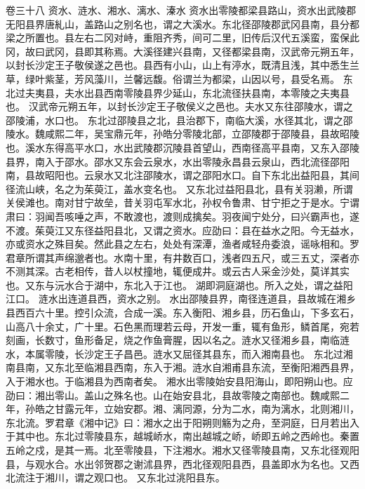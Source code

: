\documentclass[12pt,UTF8]{ctexbook}
\begin{document}
卷三十八  资水、涟水、湘水、漓水、溱水 
资水出零陵都梁县路山，资水出武陵郡无阳县界唐糺山，盖路山之别名也，谓之大溪水。东北径邵陵郡武冈县南，县分都梁之所置也。县左右二冈对峙，重阻齐秀，间可二里，旧传后汉代五溪蛮，蛮保此冈，故曰武冈，县即其称焉。大溪径建兴县南，又径都梁县南，汉武帝元朔五年，以封长沙定王子敬侯遂之邑也。县西有小山，山上有渟水，既清且浅，其中悉生兰草，绿叶紫茎，芳风藻川，兰馨远馥。俗谓兰为都梁，山因以号，县受名焉。
东北过夫夷县，夫水出县西南零陵县界少延山，东北流径扶县南，本零陵之夫夷县也。
汉武帝元朔五年，以封长沙定王子敬侯义之邑也。夫水又东往邵陵水，谓之邵陵浦，水口也。
东北过邵陵县之北，县治郡下，南临大溪，水径其北，谓之邵陵水。魏咸熙二年，吴宝鼎元年，孙皓分零陵北部，立邵陵郡于邵陵县，县故昭陵也。溪水东得高平水口，水出武陵郡沉陵县首望山，西南径高平县南，又东入邵陵县界，南入于邵水。邵水又东会云泉水，水出零陵永昌县云泉山，西北流径邵阳南，县故昭阳也。云泉水又北注邵陵水，谓之邵阳水口。自下东北出益阳县，其间径流山峡，名之为茱萸江，盖水变名也。
又东北过益阳县北，县有关羽濑，所谓关侯滩也。南对甘宁故垒，昔关羽屯军水北，孙权令鲁肃、甘宁拒之于是水。宁谓肃曰：羽闻吾咳唾之声，不敢渡也，渡则成擒矣。羽夜闻宁处分，曰兴霸声也，遂不渡。茱萸江又东径益阳县北，又谓之资水。应劭曰：县在益水之阳。今无益水，亦或资水之殊目矣。然此县之左右，处处有深潭，渔者咸轻舟委浪，谣咏相和。罗君章所谓其声绵邈者也。水南十里，有井数百口，浅者四五尺，或三五丈，深者亦不测其深。古老相传，昔人以杖撞地，辄便成井。或云古人采金沙处，莫详其实也。又东与沅水合于湖中，东北入于江也。
湖即洞庭湖也。所入之处，谓之益阳江口。
涟水出连道县西，资水之别。
水出邵陵县界，南径连道县，县故城在湘乡县西百六十里。控引众流，合成一溪。东入衡阳、湘乡县，历石鱼山，下多玄石，山高八十余丈，广十里。石色黑而理若云母，开发一重，辄有鱼形，鳞首尾，宛若刻画，长数寸，鱼形备足，烧之作鱼膏腥，因以名之。涟水又径湘乡县，南临涟水，本属零陵，长沙定王子昌邑。涟水又屈径其县东，而入湘南县也。
东北过湘南县南，又东北至临湘县西南，东入于湘。涟水自湘甫县东流，至衡阳湘西县界，入于湘水也。于临湘县为西南者矣。
湘水出零陵始安县阳海山，即阳朔山也。应劭曰：湘出零山。盖山之殊名也。山在始安县北，县故零陵之南部也。魏咸熙二年，孙皓之甘露元年，立始安郡。湘、漓同源，分为二水，南为漓水，北则湘川，东北流。罗君章《湘中记》曰：湘水之出于阳朔则觞为之舟，至洞庭，日月若出入于其中也。东北过零陵县东，越城峤水，南出越城之峤，峤即五岭之西岭也。秦置五岭之戍，是其一焉。北至零陵县，下注湘水。湘水又径零陵县南，又东北径观阳县，与观水合。水出邻贺郡之谢沭县界，西北径观阳县西，县盖即水为名也。又西北流注于湘川，谓之观口也。
又东北过洮阳县东。
\end{document}

